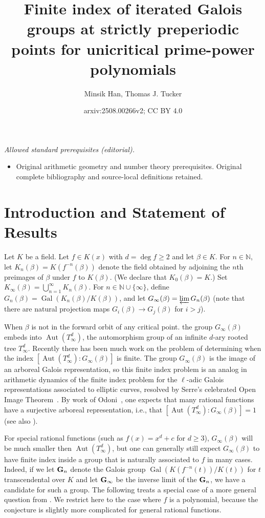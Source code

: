 \documentclass[11pt]{amsart}
\title{Finite index of iterated Galois groups at strictly preperiodic points for unicritical prime-power polynomials}
\author{Minsik Han, Thomas J. Tucker}
\date{arxiv:2508.00266v2; CC BY 4.0}
\theoremstyle{definition}
\theoremstyle{definition}
\numberwithin{thm}{section}
\numberwithin{equation}{thm}
\newcommand{\N}{\ensuremath{{\mathbb{N}}}}
\newcommand{\lra}{\longrightarrow}
\DeclareMathOperator{\Gal}{Gal}
\DeclareMathOperator{\Aut}{Aut}
\begin{document}
\maketitle
\noindent\textit{Allowed standard prerequisites (editorial).}\begin{itemize}
\item Original arithmetic geometry and number theory prerequisites. Original complete bibliography and source-local definitions retained.
\end{itemize}\medskip
\section{Introduction and Statement of Results}\label{intro}
Let $K$ be a field.  Let $f\in K(x)$ with $d=\deg f\geq 2$ and let
$\beta\in K$.  For $n\in\N$, let
$K_n(\beta)=K(f^{-n}(\beta))$ denote the field obtained by adjoining the
$n$th preimages of $\beta$ under $f$ to $K(\beta)$. (We declare that
$K_0(\beta)=K$.)  Set
$K_\infty(\beta)=\bigcup_{n=1}^\infty K_n(\beta)$.  For
$n\in\N\cup\{\infty\}$, define
$G_n(\beta)=\Gal(K_n(\beta)/K(\beta))$, and let $G_\infty(\beta) =
\varprojlim G_n (\beta)$ (note that there are natural projection maps $G_i (\beta)
\lra G_j (\beta)$ for $i  > j$).  

When $\beta$ is not in the forward orbit of any critical point.  the
group $G_\infty(\beta)$ embeds into $\Aut(T^d_\infty)$, the
automorphism group of an infinite $d$-ary rooted tree
$T^d_\infty$. Recently there has been much work on the problem of
determining when the index $[\Aut(T^d_\infty):G_\infty(\beta)]$ is
finite. The group $G_\infty(\beta)$ is the image of an arboreal Galois
representation, so this finite index problem is an analog in
arithmetic dynamics of the finite index problem for the $\ell$-adic
Galois representations associated to elliptic curves, resolved by
Serre's celebrated Open Image Theorem~\cite{Serre}. By work of
Odoni~\cite{OdoniIterates}, one expects that many rational functions
have a surjective arboreal representation, i.e., that
$[\Aut(T^d_\infty):G_\infty(\beta)]=1$ (see also \cite{OC, NL,
  Kadets, False, RafeS}).  

For special rational functions (such as $f(x) = x^d + c$ for
$d \geq 3$), $G_\infty(\beta)$ will be much smaller then
$\Aut(T^d_\infty)$, but one can generally still expect
$G_\infty(\beta)$ to have finite index inside a group that is
naturally associated to $f$ in many cases.  Indeed, if we let ${\bf
  G}_n$ denote the Galois group $\Gal(K(f^{-n}(t)) / K(t))$ for $t$
transcendental over $K$ and let ${\bf G}_\infty$ be the inverse limit
of the ${\bf G}_n$, we have a candidate for such a group.  The
following treats a special case of a more general question from
\cite{Conjecture}. We restrict here to the case where $f$ is a
polynomial, because the conjecture is slightly more complicated for
general rational functions.  
\end{document}
